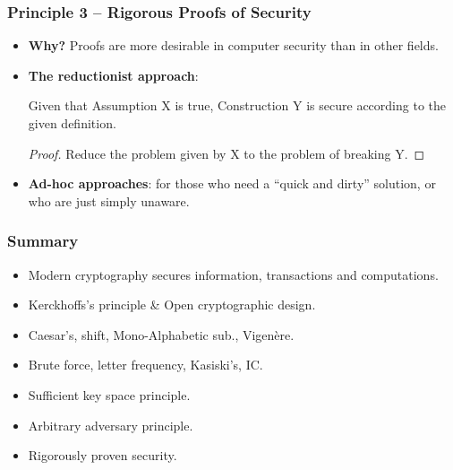 \begin{frame}\frametitle{Principle 3 -- Rigorous Proofs of Security}
\begin{itemize}
\item \textbf{Why?} Proofs are more desirable in computer security than in other fields.
\item \textbf{The reductionist approach}: 
\begin{theorem}	Given that Assumption X is true, Construction Y is secure according to the given definition.
\end{theorem}
\begin{proof} Reduce the problem given by X to the problem of breaking Y.
\end{proof}
\item \textbf{Ad-hoc approaches}: for those who need a ``quick and dirty'' solution, or who are just simply unaware.
\end{itemize}
\end{frame}
\begin{frame}\frametitle{Summary}
\begin{itemize}
\item Modern cryptography secures information, transactions and computations.
\item Kerckhoffs's principle \& Open cryptographic design.
\item Caesar's, shift, Mono-Alphabetic sub., Vigen\`{e}re.
\item Brute force, letter frequency, Kasiski's, IC.
\item Sufficient key space principle.
		\item Arbitrary adversary principle.
		\item Rigorously proven security.
	\end{itemize}
\end{frame}


